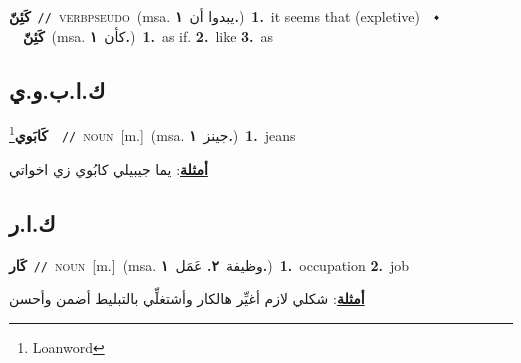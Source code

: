 \documentclass[10pt,a4paper,twoside]{article} %
\begin{document}
\begin{multicols}{2}
{{\setlength\topsep{0pt}\textbf{\foreignlanguage{arabic}{كَئِنّ}}\ {\color{gray}\texttt{//}\color{black}}\ \textsc{verb\textunderscore pseudo}\ \color{gray}(msa. \foreignlanguage{arabic}{يبدوا أن}~\foreignlanguage{arabic}{\textbf{١.}})\color{black}\ \textbf{1.}~it seems that (expletive)\ \ $\smblkdiamond$\ \ \setlength\topsep{0pt}\textbf{\foreignlanguage{arabic}{كَئِنّ}}\ \color{gray}(msa. \foreignlanguage{arabic}{كأن}~\foreignlanguage{arabic}{\textbf{١.}})\color{black}\ \textbf{1.}~as if.  \textbf{2.}~like  \textbf{3.}~as\ 

\vspace{-3mm}
\subsection*{\color{blue}\foreignlanguage{arabic}{ك.ا.ب.و.ي}\color{blue}{ (ntws)}} 

{\setlength\topsep{0pt}\textbf{\foreignlanguage{arabic}{كَابَوي}}\footnote{Loanword}\ \ {\color{gray}\texttt{//}\color{black}}\ \textsc{noun}\ [m.]\ \color{gray}(msa. \foreignlanguage{arabic}{جينز}~\foreignlanguage{arabic}{\textbf{١.}})\color{black}\ \textbf{1.}~jeans\  \begin{flushright}\color{gray}\foreignlanguage{arabic}{\textbf{\underline{\foreignlanguage{arabic}{أمثلة}}}: يما جيبيلي كابُوي زي اخواتي}\end{flushright}\color{black}} \vspace{2mm}

\vspace{-3mm}
\subsection*{\color{blue}\foreignlanguage{arabic}{ك.ا.ر}\color{blue}{ (ntws)}} 

{\setlength\topsep{0pt}\textbf{\foreignlanguage{arabic}{كَار}}\ {\color{gray}\texttt{//}\color{black}}\ \textsc{noun}\ [m.]\ \color{gray}(msa. \foreignlanguage{arabic}{وظيفة}~\foreignlanguage{arabic}{\textbf{٢.}}  \foreignlanguage{arabic}{عَمَل}~\foreignlanguage{arabic}{\textbf{١.}})\color{black}\ \textbf{1.}~occupation  \textbf{2.}~job\  \begin{flushright}\color{gray}\foreignlanguage{arabic}{\textbf{\underline{\foreignlanguage{arabic}{أمثلة}}}: شكلي لازم أغيِّر هالكار وأشتغلِّي بالتبليط أضمن وأحسن}\end{flushright}\color{black}} \vspace{2mm}

}}
\end{multicols}
\end{document}
